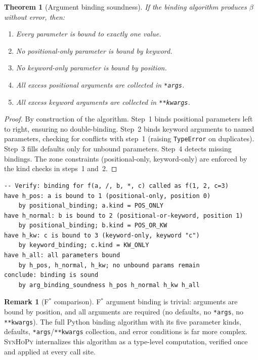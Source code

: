 \documentclass[11pt,a4paper]{report}
\theoremstyle{definition}
\newtheorem{remark}[definition]{Remark}
\theoremstyle{plain}
\newtheorem{theorem}[definition]{Theorem}
\newcommand{\fstar}{F$^{*}$}
\newcommand{\synhopy}{\textsc{SynHoPy}}
\begin{document}
\begin{theorem}[Argument binding soundness]
\label{thm:arg-binding}
If the binding algorithm produces $\beta$ without error, then:
\begin{enumerate}
  \item Every parameter is bound to exactly one value.
  \item No positional-only parameter is bound by keyword.
  \item No keyword-only parameter is bound by position.
  \item All excess positional arguments are collected in \texttt{*args}.
  \item All excess keyword arguments are collected in \texttt{**kwargs}.
\end{enumerate}
\end{theorem}
\begin{proof}
By construction of the algorithm.  Step~1 binds positional parameters
left to right, ensuring no double-binding.  Step~2 binds keyword arguments
to named parameters, checking for conflicts with step~1 (raising
\lstinline[style=python]{TypeError} on duplicates).  Step~3 fills defaults
only for unbound parameters.  Step~4 detects missing bindings.
The zone constraints (positional-only, keyword-only) are enforced by the
kind checks in steps~1 and~2.
\end{proof}

\begin{lstlisting}[style=proof]
-- Verify: binding for f(a, /, b, *, c) called as f(1, 2, c=3)
have h_pos: a is bound to 1 (positional-only, position 0)
    by positional_binding; a.kind = POS_ONLY
have h_normal: b is bound to 2 (positional-or-keyword, position 1)
    by positional_binding; b.kind = POS_OR_KW
have h_kw: c is bound to 3 (keyword-only, keyword "c")
    by keyword_binding; c.kind = KW_ONLY
have h_all: all parameters bound
    by h_pos, h_normal, h_kw; no unbound params remain
conclude: binding is sound
    by arg_binding_soundness h_pos h_normal h_kw h_all
\end{lstlisting}

\begin{remark}[\fstar{} comparison]
\fstar{} argument binding is trivial: arguments are bound by position,
and all arguments are required (no defaults, no \texttt{*args}, no
\texttt{**kwargs}).  The full Python binding algorithm with its five
parameter kinds, defaults, \texttt{*args}/\texttt{**kwargs} collection,
and error conditions is far more complex.  \synhopy{} internalizes this
algorithm as a type-level computation, verified once and applied at every
call site.
\end{remark}
\end{document}
